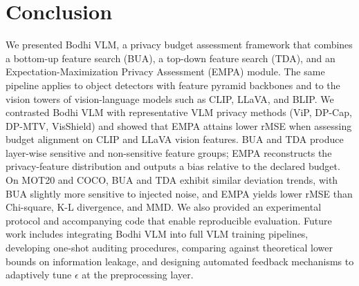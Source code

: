 \documentclass[journal,transmag]{IEEEtran}
\begin{document}
\section{Conclusion}
\label{sec:conclusion}

We presented Bodhi VLM, a privacy budget assessment framework that combines a bottom-up feature search (BUA), a top-down feature search (TDA), and an Expectation-Maximization Privacy Assessment (EMPA) module. The same pipeline applies to object detectors with feature pyramid backbones and to the vision towers of vision-language models such as CLIP, LLaVA, and BLIP. We contrasted Bodhi VLM with representative VLM privacy methods (ViP, DP-Cap, DP-MTV, VisShield) and showed that EMPA attains lower rMSE when assessing budget alignment on CLIP and LLaVA vision features. BUA and TDA produce layer-wise sensitive and non-sensitive feature groups; EMPA reconstructs the privacy-feature distribution and outputs a bias relative to the declared budget. On MOT20 and COCO, BUA and TDA exhibit similar deviation trends, with BUA slightly more sensitive to injected noise, and EMPA yields lower rMSE than Chi-square, K-L divergence, and MMD. We also provided an experimental protocol and accompanying code that enable reproducible evaluation. Future work includes integrating Bodhi VLM into full VLM training pipelines, developing one-shot auditing procedures, comparing against theoretical lower bounds on information leakage, and designing automated feedback mechanisms to adaptively tune $\epsilon$ at the preprocessing layer.



\end{document}
